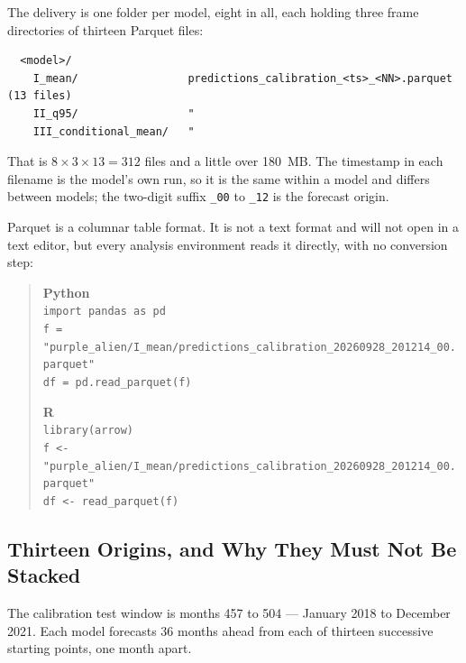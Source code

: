 The delivery is one folder per model, eight in all, each holding three frame directories of
thirteen Parquet files:

\begin{verbatim}
  <model>/
    I_mean/                 predictions_calibration_<ts>_<NN>.parquet  (13 files)
    II_q95/                 "
    III_conditional_mean/   "
\end{verbatim}

\noindent That is $8 \times 3 \times 13 = 312$ files and a little over 180~MB. The timestamp in each
filename is the model's own run, so it is the same within a model and differs between models; the
two-digit suffix \texttt{\_00} to \texttt{\_12} is the forecast origin.

Parquet is a columnar table format. It is not a text format and will not open in a text editor,
but every analysis environment reads it directly, with no conversion step:

\begin{quote}
\small
\textbf{Python} \\
\texttt{import pandas as pd} \\
\texttt{f = "purple\_alien/I\_mean/predictions\_calibration\_20260928\_201214\_00.parquet"} \\
\texttt{df = pd.read\_parquet(f)}

\medskip
\textbf{R} \\
\texttt{library(arrow)} \\
\texttt{f <- "purple\_alien/I\_mean/predictions\_calibration\_20260928\_201214\_00.parquet"} \\
\texttt{df <- read\_parquet(f)}
\end{quote}

\subsection*{Thirteen Origins, and Why They Must Not Be Stacked}

The calibration test window is months 457 to 504 --- January 2018 to December 2021. Each model
forecasts 36 months ahead from each of thirteen successive starting points, one month apart.

